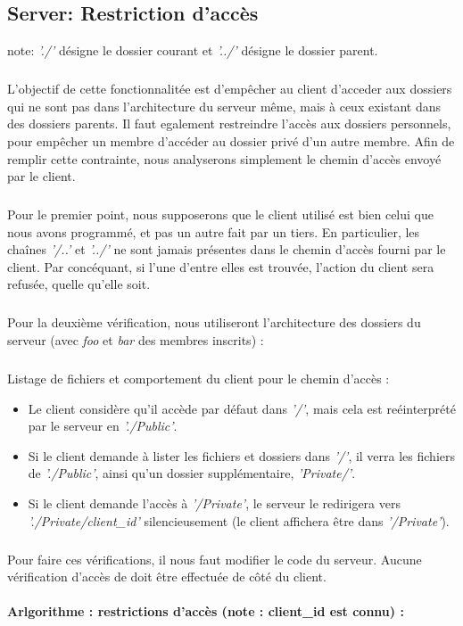 \documentclass[12pt,a4paper,twoside]{article}
\begin{document}
		\subsection{Server: Restriction d'accès} %
			note: \textit{'./'} désigne le dossier courant et \textit{'../'} désigne le dossier parent.
			\subparagraph*{}
				L'objectif de cette fonctionnalitée est d'empêcher au client d'acceder aux dossiers qui ne sont pas dans l'architecture du serveur même, mais à ceux existant dans des dossiers parents. Il faut egalement restreindre l'accès aux dossiers personnels, pour empêcher un membre d'accéder au dossier privé d'un autre membre.
				Afin de remplir cette contrainte, nous analyserons simplement le chemin d'accès envoyé par le client.
			\subparagraph*{}
				Pour le premier point, nous supposerons que le client utilisé est bien celui que nous avons programmé, et pas un autre fait par un tiers. En particulier, les chaînes \textit{'/..'} et \textit{'../'} ne sont jamais présentes dans le chemin d'accès fourni par le client. Par  concéquant, si l'une d'entre elles est trouvée, l'action du client sera refusée, quelle qu'elle soit.
			\subparagraph*{}
				Pour la deuxième vérification, nous utiliseront l'architecture des dossiers du serveur (avec \textit{foo} et \textit{bar} des membres inscrits) :
				\begin{samepage}
					
				\end{samepage}
			\subparagraph*{}
				Listage de fichiers et comportement du client pour le chemin d'accès :
				\begin{itemize}
					\item{} Le client considère qu'il accède par défaut dans \textit{'/'}, mais cela est reéinterprété par le serveur en \textit{'./Public'}.
					\item{} Si le client demande à lister les fichiers et dossiers dans \textit{'/'}, il verra les fichiers de \textit{'./Public'}, ainsi qu'un dossier supplémentaire, \textit{'Private/'}.
					\item{} Si le client demande l'accès à \textit{'/Private'}, le serveur le redirigera vers \textit{'./Private/client\_id'} silencieusement (le client affichera être dans \textit{'/Private'}).
				 \end{itemize}
			\subparagraph*{}
				Pour faire ces vérifications, il nous faut modifier le code du serveur. Aucune vérification d'accès de doit être effectuée de côté du client.
				\paragraph*{Arlgorithme : restrictions d'accès (note : client\_id est connu) :}
				
				
\end{document}
